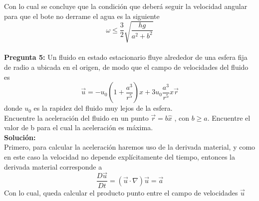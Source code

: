 \documentclass[11pt,letterpaper]{article}
\begin{document}
Con lo cual se concluye que la condición que deberá seguir la velocidad angular para que el bote no derrame el agua es la siguiente
\begin{equation}
  \omega \leq \frac{3}{2}\sqrt{\frac{hg}{a^2+b^2}}
\end{equation}
\\
\textbf{Pregunta 5:} Un fluido en estado estacionario fluye alrededor de una esfera fija de radio a ubicada en el origen, de modo que el campo de velocidades del fluido es
\begin{equation}
  \vec{u} = -u_0\left(1+\frac{a^3}{r^5}\right)\hat{x} + 3u_0\frac{a^3}{r^5}x\vec{r}
\end{equation}
donde $u_0$ es la rapidez del fluido muy lejos de la esfera. \\
Encuentre la aceleración del fluido en un punto $\vec{r}=b\hat{x}$ , con $b\geq a$. Encuentre el valor de b para el cual la aceleración es máxima.\\
\textbf{Solución:} \\
Primero, para calcular la aceleración haremos uso de la derivada material, y como en este caso la velocidad no depende explícitamente del tiempo, entonces la derivada material corresponde a 
\begin{equation}
  \frac{D\vec{u}}{Dt}=(\vec{u}\cdot\nabla)\vec{u} = \vec{a}
\end{equation}
Con lo cual, queda calcular el producto punto entre el campo de velocidades $\vec{u}$ 
\\
\end{document}
